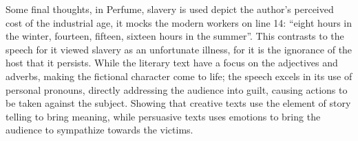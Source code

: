 \documentclass[a4paper,12pt]{article}
\begin{document}
Some final thoughts, in Perfume, slavery is used depict the author's perceived cost of the industrial age, it mocks the modern workers on line 14: ``eight hours in the winter, fourteen, fifteen, sixteen hours in the summer''. This contrasts to the speech for it viewed slavery as an unfortunate illness, for it is the ignorance of the host that it persists. While the literary text have a focus on the adjectives and adverbs, making the fictional character come to life; the speech excels in its use of personal pronouns, directly addressing the audience into guilt, causing actions to be taken against the subject. Showing that creative texts use the element of story telling to bring meaning, while persuasive texts uses emotions to bring the audience to sympathize towards the victims.
\end{document}
